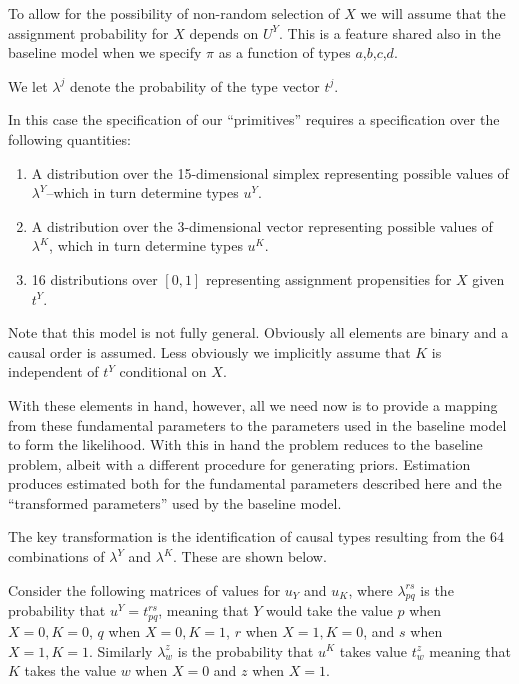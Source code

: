 \documentclass[12pt,]{book}
\providecommand{\tightlist}{%
  \setlength{\itemsep}{0pt}\setlength{\parskip}{0pt}}
\begin{document}
To allow for the possibility of non-random selection of \(X\) we will assume that the assignment probability for \(X\) depends on \(U^Y\). This is a feature shared also in the baseline model when we specify \(\pi\) as a function of types \(a\),\(b\),\(c\),\(d\).

We let \(\lambda^j\) denote the probability of the type vector \(t^j\).

In this case the specification of our ``primitives'' requires a specification over the following quantities:

\begin{enumerate}
\def\labelenumi{\arabic{enumi}.}
\tightlist
\item
  A distribution over the 15-dimensional simplex representing possible values of \(\lambda^Y\)--which in turn determine types \(u^Y\).
\item
  A distribution over the 3-dimensional vector representing possible values of \(\lambda^K\), which in turn determine types \(u^K\).
\item
  16 distributions over \([0,1]\) representing assignment propensities for \(X\) given \(t^Y\).
\end{enumerate}

Note that this model is not fully general. Obviously all elements are binary and a causal order is assumed. Less obviously we implicitly assume that \(K\) is independent of \(t^Y\) conditional on \(X\).

With these elements in hand, however, all we need now is to provide a mapping from these fundamental parameters to the parameters used in the baseline model to form the likelihood. With this in hand the problem reduces to the baseline problem, albeit with a different procedure for generating priors. Estimation produces estimated both for the fundamental parameters described here and the ``transformed parameters'' used by the baseline model.

The key transformation is the identification of causal types resulting from the 64 combinations of \(\lambda^Y\) and \(\lambda^K\). These are shown below.

Consider the following matrices of values for \(u_Y\) and \(u_K\), where \(\lambda_{pq}^{rs}\) is the probability that \(u^Y = t_{pq}^{rs}\), meaning that \(Y\) would take the value \(p\) when \(X=0, K=0\), \(q\) when \(X=0, K=1\), \(r\) when \(X=1, K=0\), and \(s\) when \(X=1, K=1\). Similarly \(\lambda_{w}^{z}\) is the probability that \(u^K\) takes value \(t_{w}^{z}\) meaning that \(K\) takes the value \(w\) when \(X=0\) and \(z\) when \(X=1\).
\end{document}
